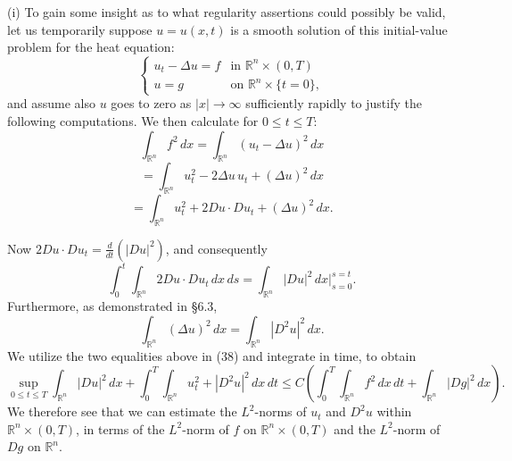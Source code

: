 \begin{remark}
\label{rem:parabolic-regularity-motivation}
(i) To gain some insight as to what regularity assertions could possibly be valid, let us temporarily suppose $u = u(x,t)$ is a smooth solution of this initial-value problem for the heat equation:
\[
\begin{cases} u_t - \Delta u = f & \text{in } \mathbb{R}^n \times (0,T) \\ u = g & \text{on } \mathbb{R}^n \times \{t = 0\}, \end{cases}
\tag{37}
\]
and assume also $u$ goes to zero as $|x| \to \infty$ sufficiently rapidly to justify the following computations. We then calculate for $0 \leq t \leq T$:
\[
\int_{\mathbb{R}^n} f^2 \, dx = \int_{\mathbb{R}^n} (u_t - \Delta u)^2 \, dx
\]
\[
= \int_{\mathbb{R}^n} u_t^2 - 2\Delta u \, u_t + (\Delta u)^2 \, dx
\tag{38}
\]
\[
= \int_{\mathbb{R}^n} u_t^2 + 2Du \cdot Du_t + (\Delta u)^2 \, dx.
\]

Now $2Du \cdot Du_t = \frac{d}{dt}(|Du|^2)$, and consequently
\[
\int_0^t \int_{\mathbb{R}^n} 2Du \cdot Du_t \, dx\,ds = \int_{\mathbb{R}^n} |Du|^2 \, dx \bigg|_{s=0}^{s=t}.
\]
Furthermore, as demonstrated in \S6.3,
\[
\int_{\mathbb{R}^n} (\Delta u)^2 \, dx = \int_{\mathbb{R}^n} |D^2u|^2 \, dx.
\]
We utilize the two equalities above in (38) and integrate in time, to obtain
\[
\sup_{0 \leq t \leq T} \int_{\mathbb{R}^n} |Du|^2 \, dx + \int_0^T \int_{\mathbb{R}^n} u_t^2 + |D^2u|^2 \, dx\,dt \leq C \left(\int_0^T \int_{\mathbb{R}^n} f^2 \, dx\,dt + \int_{\mathbb{R}^n} |Dg|^2 \, dx \right).
\tag{39}
\]
We therefore see that we can estimate the $L^2$-norms of $u_t$ and $D^2u$ within $\mathbb{R}^n \times (0,T)$, in terms of the $L^2$-norm of $f$ on $\mathbb{R}^n \times (0,T)$ and the $L^2$-norm of $Dg$ on $\mathbb{R}^n$.


\end{remark}
